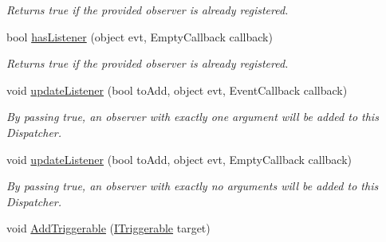 \begin{DoxyCompactItemize}
\begin{DoxyCompactList}\small\item\em Returns true if the provided observer is already registered. \end{DoxyCompactList}\item 
\hypertarget{classstrange_1_1extensions_1_1dispatcher_1_1eventdispatcher_1_1impl_1_1_event_dispatcher_a45ba390426a2ae7afe340caecaf3a7d3}{bool \hyperlink{classstrange_1_1extensions_1_1dispatcher_1_1eventdispatcher_1_1impl_1_1_event_dispatcher_a45ba390426a2ae7afe340caecaf3a7d3}{has\-Listener} (object evt, Empty\-Callback callback)}\label{classstrange_1_1extensions_1_1dispatcher_1_1eventdispatcher_1_1impl_1_1_event_dispatcher_a45ba390426a2ae7afe340caecaf3a7d3}

\begin{DoxyCompactList}\small\item\em Returns true if the provided observer is already registered. \end{DoxyCompactList}\item 
\hypertarget{classstrange_1_1extensions_1_1dispatcher_1_1eventdispatcher_1_1impl_1_1_event_dispatcher_a03806f3e9680d771231a89180afc5fe2}{void \hyperlink{classstrange_1_1extensions_1_1dispatcher_1_1eventdispatcher_1_1impl_1_1_event_dispatcher_a03806f3e9680d771231a89180afc5fe2}{update\-Listener} (bool to\-Add, object evt, Event\-Callback callback)}\label{classstrange_1_1extensions_1_1dispatcher_1_1eventdispatcher_1_1impl_1_1_event_dispatcher_a03806f3e9680d771231a89180afc5fe2}

\begin{DoxyCompactList}\small\item\em By passing true, an observer with exactly one argument will be added to this Dispatcher. \end{DoxyCompactList}\item 
\hypertarget{classstrange_1_1extensions_1_1dispatcher_1_1eventdispatcher_1_1impl_1_1_event_dispatcher_ac672efb511b97e0c198252cda026f50f}{void \hyperlink{classstrange_1_1extensions_1_1dispatcher_1_1eventdispatcher_1_1impl_1_1_event_dispatcher_ac672efb511b97e0c198252cda026f50f}{update\-Listener} (bool to\-Add, object evt, Empty\-Callback callback)}\label{classstrange_1_1extensions_1_1dispatcher_1_1eventdispatcher_1_1impl_1_1_event_dispatcher_ac672efb511b97e0c198252cda026f50f}

\begin{DoxyCompactList}\small\item\em By passing true, an observer with exactly no arguments will be added to this Dispatcher. \end{DoxyCompactList}\item 
\hypertarget{classstrange_1_1extensions_1_1dispatcher_1_1eventdispatcher_1_1impl_1_1_event_dispatcher_a6b451f5aa08a3d9c8c4244adbcba28b2}{void \hyperlink{classstrange_1_1extensions_1_1dispatcher_1_1eventdispatcher_1_1impl_1_1_event_dispatcher_a6b451f5aa08a3d9c8c4244adbcba28b2}{Add\-Triggerable} (\hyperlink{interfacestrange_1_1extensions_1_1dispatcher_1_1api_1_1_i_triggerable}{I\-Triggerable} target)}\label{classstrange_1_1extensions_1_1dispatcher_1_1eventdispatcher_1_1impl_1_1_event_dispatcher_a6b451f5aa08a3d9c8c4244adbcba28b2}


\end{DoxyCompactItemize}
